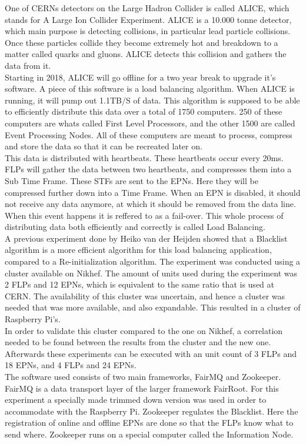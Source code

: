 One of CERNs detectors on the Large Hadron Collider is called ALICE, which stands for A Large Ion Collider Experiment. ALICE is a 10.000 tonne detector, which main purpose is detecting collisions, in particular lead particle collisions. Once these particles collide they become extremely hot and breakdown to a matter called quarks and gluons. ALICE detects this collision and gathers the data from it. \\
Starting in 2018, ALICE will go offline for a two year break to upgrade it's software. A piece of this software is a load balancing algorithm. When ALICE is running, it will pump out 1.1TB/S of data. This algorithm is supposed to be able to efficiently distribute this data over a total of 1750 computers. 250 of these computers are whats called First Level Processors, and the other 1500 are called Event Processing Nodes. All of these computers are meant to process, compress and store the data so that it can be recreated later on. \\
This data is distributed with heartbeats. These heartbeats occur every 20ms. FLPs will gather the data between two heartbeats, and compresses them into a Sub Time Frame. These STFs are sent to the EPNs. Here they will be compressed further down into a Time Frame. When an EPN is disabled, it should not receive any data anymore, at which it should be removed from the data line. When this event happens it is reffered to as a fail-over. This whole process of distributing data both efficiently and correctly is called Load Balancing. \\
A previous experiment done by Heiko van der Heijden showed that a Blacklist algorithm is a more efficient algorithm for this load balancing application, compared to a Re-initialization algorithm. The experiment was conducted using a cluster available on Nikhef. The amount of units used during the experiment was 2 FLPs and 12 EPNs, which is equivalent to the same ratio that is used at CERN. The availability of this cluster was uncertain, and hence a cluster was needed that was more available, and also expandable. This resulted in a cluster of Raspberry Pi's. \\
In order to validate this cluster compared to the one on Nikhef, a correlation needed to be found between the results from the cluster and the new one. Afterwards these experiments can be executed with an unit count of 3 FLPs and 18 EPNs, and 4 FLPs and 24 EPNs. \\
The software used consists of two main frameworks, FairMQ and Zookeeper. FairMQ is a data transport layer of the larger framework FairRoot. For this experiment a specially made trimmed down version was used in order to accommodate with the Raspberry Pi. Zookeeper regulates the Blacklist. Here the registration of online and offline EPNs are done so that the FLPs know what to send where. Zookeeper runs on a special computer called the Information Node. \\
